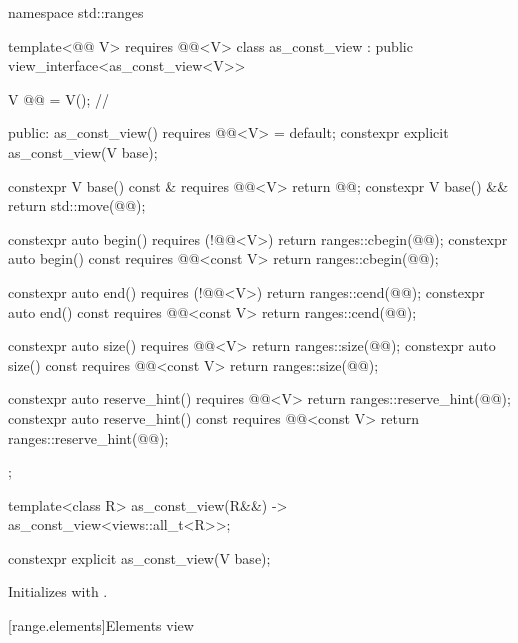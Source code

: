 %
\begin{codeblock}
namespace std::ranges {
  template<@@ V>
    requires @@<V>
  class as_const_view : public view_interface<as_const_view<V>> {
    V @@ = V();      // \expos

  public:
    as_const_view() requires @@<V> = default;
    constexpr explicit as_const_view(V base);

    constexpr V base() const & requires @@<V> { return @@; }
    constexpr V base() && { return std::move(@@); }

    constexpr auto begin() requires (!@@<V>) { return ranges::cbegin(@@); }
    constexpr auto begin() const requires @@<const V> { return ranges::cbegin(@@); }

    constexpr auto end() requires (!@@<V>) { return ranges::cend(@@); }
    constexpr auto end() const requires @@<const V> { return ranges::cend(@@); }

    constexpr auto size() requires @@<V> { return ranges::size(@@); }
    constexpr auto size() const requires @@<const V> { return ranges::size(@@); }

    constexpr auto reserve_hint() requires @@<V>
    { return ranges::reserve_hint(@@); }
    constexpr auto reserve_hint() const requires @@<const V>
    { return ranges::reserve_hint(@@); }
  };

  template<class R>
    as_const_view(R&&) -> as_const_view<views::all_t<R>>;
}
\end{codeblock}

%
\begin{itemdecl}
constexpr explicit as_const_view(V base);
\end{itemdecl}

\begin{itemdescr}
\pnum
\effects
Initializes  with .
\end{itemdescr}

[range.elements]{Elements view}

